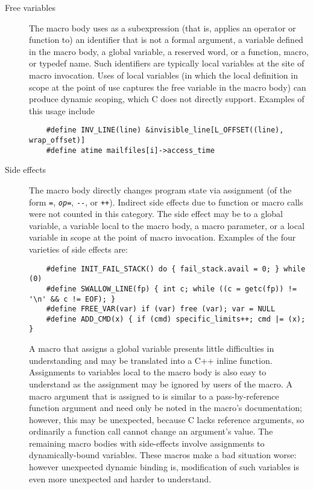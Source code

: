 \documentclass[10pt]{article}
\begin{document}
\label{desc:properties}

\begin{description}
\item[Free variables]\label{page:freevar}
  The macro body uses as a subexpression (that is, applies an operator or
  function to) an identifier that is not a formal argument, a variable defined
  in the macro body, a global variable, a reserved word, or a function, macro, or typedef
  name.  Such identifiers are typically local variables at the site of
  macro invocation.  Uses of local variables (in which the local definition
  in scope at the point of use captures the free variable in the macro
  body) can produce dynamic scoping, which C does not directly support.
  Examples of this usage include
\begin{verbatim}
    #define INV_LINE(line) &invisible_line[L_OFFSET((line), wrap_offset)]
    #define atime mailfiles[i]->access_time
\end{verbatim}

\item[Side effects]
  The macro body directly changes program state via assignment (of the form
  {\tt =}, {\tt {\em op}=}, {\tt -{}-}, or {\tt ++}).  
  Indirect side
  effects due to function or macro calls were not counted in this category.
  The side effect may be to a
  global variable, a variable local to the macro body, a macro parameter,
  or a local variable in scope at the point of macro invocation.
  Examples of the four varieties of side effects are:
\begin{verbatim}
    #define INIT_FAIL_STACK() do { fail_stack.avail = 0; } while (0)
    #define SWALLOW_LINE(fp) { int c; while ((c = getc(fp)) != '\n' && c != EOF); }
    #define FREE_VAR(var) if (var) free (var); var = NULL
    #define ADD_CMD(x) { if (cmd) specific_limits++; cmd |= (x); }
\end{verbatim}

  A macro that assigns a global variable presents little difficulties in
  understanding and may be translated into a C++ inline function.
  Assignments to variables local to the macro body is also easy to understand
  as the assignment may be ignored by users
  of the macro.  A macro argument that is assigned to is similar to a
  pass-by-reference function argument and need only be noted in the macro's
  documentation; however, this may be unexpected, because C lacks reference
  arguments, so ordinarily a function call cannot change an argument's
  value.  The remaining macro bodies with side-effects involve assignments
  to dynamically-bound variables.  These macros make a bad situation worse: however
  unexpected dynamic binding is, modification of such variables is even
  more unexpected and harder to understand.
  


\end{description}
\end{document}
